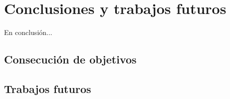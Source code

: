 \section{Conclusiones y trabajos futuros}
En conclusión...

\subsection{Consecución de objetivos}

\subsection{Trabajos futuros}
